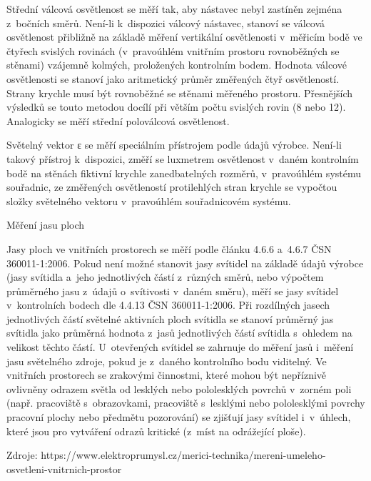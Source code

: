 \medskip
Střední válcová osvětlenost se měří tak, aby nástavec nebyl zastíněn zejména z~bočních směrů.
Není-li k~dispozici válcový nástavec, stanoví se válcová osvětlenost přibližně na základě měření
vertikální osvětlenosti v~měřicím bodě ve čtyřech svislých rovinách (v~pravoúhlém vnitřním prostoru
rovnoběžných se stěnami) vzájemně kolmých, proložených kontrolním bodem. Hodnota válcové osvětlenosti
se stanoví jako aritmetický průměr změřených čtyř osvětleností. Strany krychle musí být rovnoběžné
se stěnami měřeného prostoru. Přesnějších výsledků se touto metodou docílí při větším počtu svislých
rovin (8 nebo 12). Analogicky se měří střední poloválcová osvětlenost.

\medskip
Světelný vektor ε se měří speciálním přístrojem podle údajů výrobce. Není-li takový přístroj k~dispozici,
změří se luxmetrem osvětlenost v~daném kontrolním bodě na stěnách fiktivní krychle zanedbatelných rozměrů,
v~pravoúhlém systému souřadnic, ze změřených osvětleností protilehlých stran krychle se vypočtou složky
světelného vektoru v~pravoúhlém souřadnicovém systému.

\sec Měření jasu ploch

Jasy ploch ve vnitřních prostorech se měří podle článku 4.6.6 a~4.6.7 ČSN 360011-1:2006. Pokud není
možné stanovit jasy svítidel na základě údajů výrobce (jasy svítidla a~jeho jednotlivých částí z~různých
směrů, nebo výpočtem průměrného jasu z~údajů o~svítivosti v~daném směru), měří se jasy svítidel v~kontrolních
bodech dle 4.4.13 ČSN 360011-1:2006.
\medskip
Při rozdílných jasech jednotlivých částí světelné aktivních ploch svítidla se stanoví průměrný jas
svítidla jako průměrná hodnota z~jasů jednotlivých částí svítidla s~ohledem na velikost těchto částí.
U~otevřených svítidel se zahrnuje do měření jasů i~měření jasu světelného zdroje, pokud je z~daného
kontrolního bodu viditelný.
\medskip
Ve vnitřních prostorech se zrakovými činnostmi, které mohou být nepříznivě ovlivněny odrazem světla
od lesklých nebo pololesklých povrchů v~zorném poli (např. pracoviště s~obrazovkami, pracoviště s~lesklými
nebo pololesklými povrchy pracovní plochy nebo předmětu pozorování) se zjišťují jasy svítidel i~v~úhlech,
které jsou pro vytváření odrazů kritické (z~míst na odrážející ploše).

\medskip
Zdroje: https://www.elektroprumysl.cz/merici-technika/mereni-umeleho-osvetleni-vnitrnich-prostor